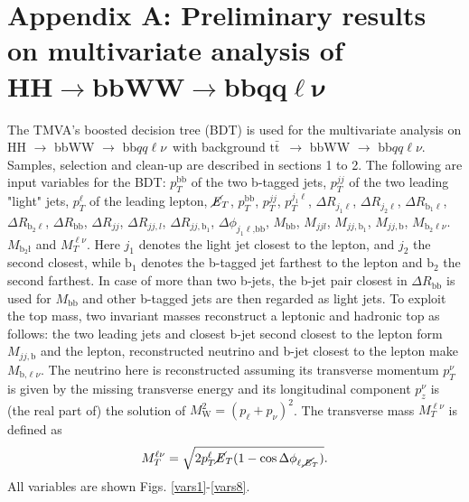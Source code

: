\documentclass[10pt,a4paper]{article}
\renewcommand{\tt}{$\text{t}\bar{\text{t}}$}
\newcommand{\semi}{$\rightarrow$ bbWW $\rightarrow$ bb$qq\ell\nu$}
\newcommand{\lnu}{$\ell\nu$}
\newcommand{\bb}{\text{bb}}
\newcommand{\MET}{$\cancel{\it{E}}_{T}$}
\begin{document}
\section*{Appendix A: Preliminary results on multivariate analysis of\\ \mbox{$\bm{\text{HH} \rightarrow \text{bbWW} \rightarrow \text{bb} qq\ell\nu}$}}

The TMVA's boosted decision tree (BDT) is used for the multivariate analysis on HH \semi\ with background \tt\ \semi. Samples, selection and clean-up are described in sections 1 to 2. The following are input variables for the BDT:
$p_T^\text{bb}$ of the two b-tagged jets,
$p_T^{jj}$ of the two leading "light" jets,
$p_T^\ell$ of the leading lepton,
\MET,
$p_T^\text{bb}$,
$p_T^{jj}$,
$p_T^{j_1\ell}$,
$\Delta R_{j_1\ell}$,
$\Delta R_{j_2\ell}$,
$\Delta R_{\text{b}_1\ell}$,
$\Delta R_{\text{b}_2\ell}$,
$\Delta R_{\bb}$,
$\Delta R_{jj}$,
$\Delta R_{jj,l}$,
$\Delta R_{jj,\text{b}_1}$,
$\Delta\phi_{j_1\ell\text{,bb}}$,
$M_{\bb}$,
$M_{jjl}$,
$M_{jj,\text{b}_1}$,
$M_{jj,\text{b}}$,
$M_{\text{b}_2\text{\lnu}}$.
$M_{\text{b}_2\text{\l}}$ and
$M_T^{\ell\nu}$.
Here $j_1$ denotes the light jet closest to the lepton, and $j_2$ the second closest, while $\text{b}_1$ denotes the b-tagged jet farthest to the lepton and $\text{b}_2$ the second farthest. In case of more than two b-jets, the b-jet pair closest in $\Delta R_{\bb}$ is used for $M_{\bb}$ and other b-tagged jets are then regarded as light jets.
To exploit the top mass, two invariant masses reconstruct a leptonic and hadronic top as follows: the two leading jets and closest b-jet second closest to the lepton form $M_{jj,\text{b}}$ and the lepton, reconstructed neutrino and b-jet closest to the lepton make $M_{\text{b,\lnu}}$. The neutrino here is reconstructed assuming its transverse momentum $p^\nu_T$ is given by the missing transverse energy and its longitudinal component $p^\nu_z$ is (the real part of) the solution of $M_\text{W}^2 = (p_\ell + p_\nu)^2$.
The transverse mass $M_T^{\ell\nu}$ is defined as
\begin{equation} \label{MT}
	M_T^{\ell\nu} = \sqrt{ 2 p_T^\ell \text{\MET} ( 1 - \cos \Delta \phi_{\ell,\text{\MET}} )}.
\end{equation}
All variables are shown Figs. \ref{vars1}-\ref{vars8}.
\end{document}
